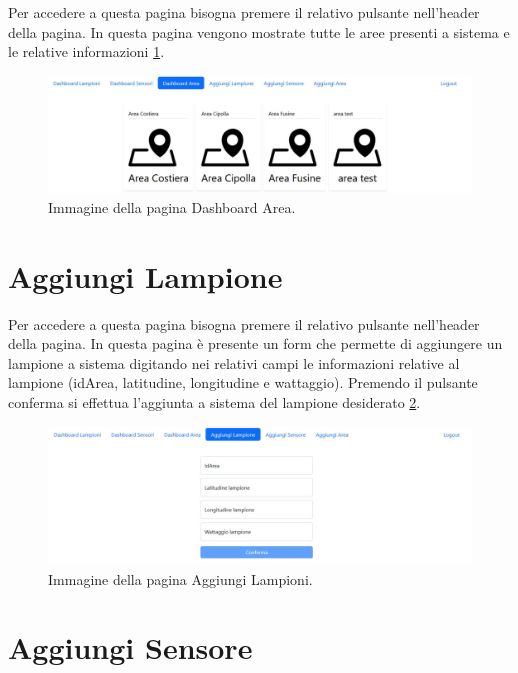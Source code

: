Per accedere a questa pagina bisogna premere il relativo pulsante nell'header della pagina. In questa pagina vengono mostrate tutte le aree presenti a sistema e le relative informazioni \ref{fig:lista_area}.

\begin{figure}[ht]
    \centering
    \includegraphics[width=\textwidth]{img/lista_area.jpeg}
    \caption{Immagine della pagina Dashboard Area.}
    \label{fig:lista_area}
\end{figure}

\section{Aggiungi Lampione}

Per accedere a questa pagina bisogna premere il relativo pulsante nell'header della pagina. In questa pagina è presente un form che permette di aggiungere un lampione a sistema digitando nei relativi campi le informazioni relative al lampione (idArea, latitudine, longitudine e wattaggio). Premendo il pulsante conferma si effettua l'aggiunta a sistema del lampione desiderato \ref{fig:aggiunta_lamp}.

\begin{figure}[ht]
    \centering
    \includegraphics[width=\textwidth]{img/aggiunta_lamp.jpeg}
    \caption{Immagine della pagina Aggiungi Lampioni.}
    \label{fig:aggiunta_lamp}
\end{figure}

\section{Aggiungi Sensore}


